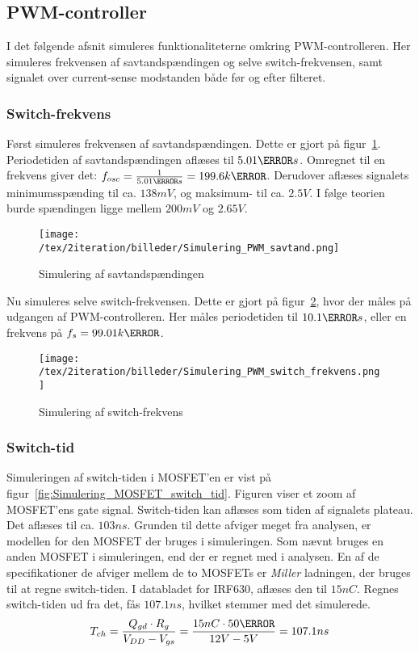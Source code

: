 
\subsection{PWM-controller}
I det følgende afsnit simuleres funktionaliteterne omkring PWM-controlleren. Her simuleres frekvensen af savtandspændingen og selve switch-frekvensen, samt signalet over current-sense modstanden både før og efter filteret.

\subsubsection{Switch-frekvens}
Først simuleres frekvensen af savtandspændingen. Dette er gjort på figur~\ref{fig:Simulering_PWM_savtand}. Periodetiden af savtandspændingen aflæses til $5.01\micro s$. Omregnet til en frekvens giver det: $f_{osc}=\frac{1}{5.01\micro s}=199.6k\hertz$. Derudover aflæses signalets minimumsspænding til ca. $138mV$, og maksimum- til ca. $2.5V$. I følge teorien burde spændingen ligge mellem $200mV$ og $2.65V$.

\begin{figure}[H]
	\center
	\texttt{[image: /tex/2iteration/billeder/Simulering\_PWM\_savtand.png]}
	\caption{Simulering af savtandspændingen}
	\label{fig:Simulering_PWM_savtand}
\end{figure}

Nu simuleres selve switch-frekvensen. Dette er gjort på figur~\ref{fig:Simulering_PWM_switch_frekvens}, hvor der måles på udgangen af PWM-controlleren. Her måles periodetiden til $10.1\micro s$, eller en frekvens på $f_s=99.01k\hertz$. 

\begin{figure}[H]
	\center
	\texttt{[image: /tex/2iteration/billeder/Simulering\_PWM\_switch\_frekvens.png]}
	\caption{Simulering af switch-frekvens}
	\label{fig:Simulering_PWM_switch_frekvens}
\end{figure}

\subsubsection{Switch-tid}
Simuleringen af switch-tiden i MOSFET'en er vist på figur~\ref{fig:Simulering_MOSFET_switch_tid}. Figuren viser et zoom af MOSFET'ens gate signal. Switch-tiden kan aflæses som tiden af signalets plateau. Det aflæses til ca. $103ns$. Grunden til dette afviger meget fra analysen, er modellen for den MOSFET der bruges i simuleringen. Som nævnt bruges en anden MOSFET i simuleringen, end der er regnet med i analysen. En af de specifikationer de afviger mellem de to MOSFETs er \textit{Miller} ladningen, der bruges til at regne switch-tiden. I databladet for IRF630\cite{IRF630}, aflæses den til $15nC$. Regnes switch-tiden ud fra det, fås $107.1ns$, hvilket stemmer med det simulerede. 
\begin{equation} 
T_{ch} = \frac{Q_{gd} \cdot R_{g}}{V_{DD}-V_{gs}} = \frac{15nC \cdot 50\ohm}{12V-5V} = 107.1ns
\end{equation}

